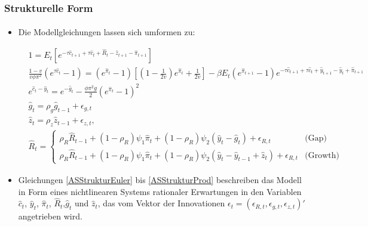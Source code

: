 \documentclass[10pt]{beamer}  %
\begin{document}
\begin{frame}\label{Struktur}
\frametitle{Strukturelle Form}\framesubtitle{}
\begin{itemize}
\item Die Modellgleichungen lassen sich umformen zu: \hyperlink{app:Struktur}{}
\begin{tiny}
\begin{eqnarray}
&1 = E_t \left[e^{-\tau \widehat{c}_{t+1} +\tau \widehat{c}_t+\widehat{R}_t - \widehat{z}_{t+1} - \widehat{\pi}_{t+1}}\right] \label{ASStrukturEuler}\\
& \frac{1-v}{v \phi \pi^2 } \left(e^{\tau \widehat{c}_{t}}-1\right) =
\left(e^{\widehat{\pi}_t}-1\right) \left[\left(1-\frac{1}{2v}\right)e^{\widehat{\pi}_t} + \frac{1}{2v}\right]
- \beta E_t \left(e^{\widehat{\pi}_{t+1}}-1\right)e^{-\tau \widehat{c}_{t+1} + \tau \widehat{c}_t + \widehat{y}_{t+1} - \widehat{y}_t + \widehat{\pi}_{t+1}} \label{ASStrukturPreis}\\
& e^{\widehat{c}_t-\widehat{y}_t} = e^{-\widehat{g}_t} -\frac{\phi \pi^2 g}{2} \left(e^{\widehat{\pi}_t}-1\right)^2\label{ASStrukturGueter}\\
& \widehat{g}_t = \rho_g \widehat{g}_{t-1} + \epsilon_{g,t}\label{ASStrukturGovt}\\
& \widehat{z}_t = \rho_z\widehat{z}_{t-1}+\epsilon_{z,t}\label{ASStrukturProd},
\end{eqnarray}
\begin{eqnarray}
&\hat{R}_t = \begin{cases}
    \rho_R \hat{R}_{t-1} + (1-\rho_R)\psi_1 \hat{\pi}_t + (1-\rho_R)\psi_2 \left(\hat{y}_t-\hat{g}_t\right) +\epsilon_{R,t} & \text{(Gap)}\\
    \rho_R \hat{R}_{t-1} + (1-\rho_R)\psi_1 \hat{\pi}_t + (1-\rho_R)\psi_2 \left(\hat{y}_t-\hat{y}_{t-1} +\hat{z}_t\right) +\epsilon_{R,t} & \text{(Growth)}
   \end{cases}\label{ASStrukturZins}
\end{eqnarray}
\end{tiny}
\item Gleichungen \eqref{ASStrukturEuler} bis \eqref{ASStrukturProd} beschreiben das Modell in Form eines nichtlinearen Systems rationaler Erwartungen in den Variablen $\widehat{c}_t$, $\widehat{y}_t$, $\widehat{\pi}_t$, $\widehat{R}_t$,$\widehat{g}_t$ und $\widehat{z}_t$, das vom Vektor der Innovationen $\epsilon_t = (\epsilon_{R,t},\epsilon_{g,t},\epsilon_{z,t})'$ angetrieben wird.
\end{itemize}
\end{frame}
\end{document}
